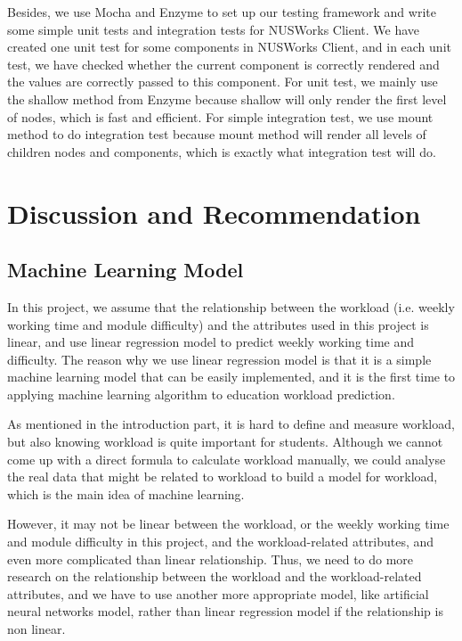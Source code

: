 \documentclass[fyp]{socreport}
\begin{document}
Besides, we use Mocha and Enzyme to set up our testing framework and write some simple unit tests and integration tests for NUSWorks Client. We have created one unit test for some components in NUSWorks Client, and in each unit test, we have checked whether the current component is correctly rendered and the values are correctly passed to this component. For unit test, we mainly use the shallow method from Enzyme because shallow will only render the first level of nodes, which is fast and efficient. For simple integration test, we use mount method to do integration test because mount method will render all levels of children nodes and components, which is exactly what integration test will do.

\chapter{Discussion and Recommendation}
\section{Machine Learning Model}
In this project, we assume that the relationship between the workload (i.e. weekly working time and module difficulty) and the attributes used in this project is linear, and use linear regression model to predict weekly working time and difficulty. The reason why we use linear regression model is that it is a simple machine learning model that can be easily implemented, and it is the first time to applying machine learning algorithm to education workload prediction.

As mentioned in the introduction part, it is hard to define and measure workload, but also knowing workload is quite important for students. Although we cannot come up with a direct formula to calculate workload manually, we could analyse the real data that might be related to workload to build a model for workload, which is the main idea of machine learning.

However, it may not be linear between the workload, or the weekly working time and module difficulty in this project, and the workload-related attributes, and even more complicated than linear relationship. Thus, we need to do more research on the relationship between the workload and the workload-related attributes, and we have to use another more appropriate model, like artificial neural networks model, rather than linear regression model if the relationship is non linear.
\end{document}
